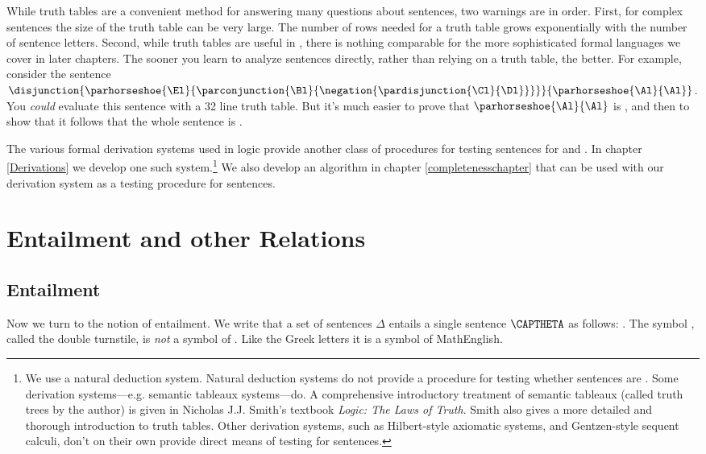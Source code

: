 While truth tables are a convenient method for answering many questions about \GSL{} sentences, two warnings are in order.
First, for complex sentences the size of the truth table can be very large.
The number of rows needed for a truth table grows exponentially with the number of sentence letters.
Second, while truth tables are useful in \GSL{}, there is nothing comparable for the more sophisticated formal languages we cover in later chapters.
The sooner you learn to analyze sentences directly, rather than relying on a truth table, the better.
For example, consider the sentence $\disjunction{\parhorseshoe{\El}{\parconjunction{\Bl}{\negation{\pardisjunction{\Cl}{\Dl}}}}}{\parhorseshoe{\Al}{\Al}}$.
You \emph{could} evaluate this sentence with a 32 line truth table.
But it's much easier to prove that $\parhorseshoe{\Al}{\Al}$ is , and then to show that it follows that the whole sentence is .

The various formal derivation systems used in logic provide another class of procedures for testing \GSL{} sentences for  and .
In chapter \ref{Derivations} we develop one such system.\footnote{
	We use a natural deduction system.
	Natural deduction systems do not provide a procedure for testing whether sentences are .
	Some derivation systems---e.g. semantic tableaux systems---do. 
	A comprehensive introductory treatment of semantic tableaux (called truth trees by the author) is given in Nicholas J.J. Smith's \citeyearpar{Smith2012} textbook \emph{Logic: The Laws of Truth}. 
	Smith also gives a more detailed and thorough introduction to truth tables. 
	Other derivation systems, such as Hilbert-style axiomatic systems, and Gentzen-style sequent calculi, don't on their own provide direct means of testing for  sentences. 
}
We also develop an algorithm in chapter \ref{completenesschapter} that can be used with our derivation system as a testing procedure for  sentences.

\section{Entailment and other Relations}

\subsection{Entailment}\label{Entailment}
Now we turn to the notion of entailment. 
We write that a set of sentences $\Delta$ entails a single sentence $\CAPTHETA$ as follows: \mention{\:$\Delta\sdtstile{}{}\CAPTHETA\:$}.
The symbol \mention{$\:\sdtstile{}{}\:$}, called the double turnstile,\index{$\sdtstile{}{}$} is \emph{not} a symbol of \GSL{}. 
Like the Greek letters it is a symbol of MathEnglish.

